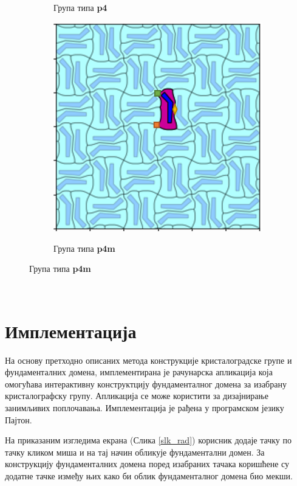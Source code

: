 \documentclass[12pt]{article}
\begin{document}
\begin{samepage}
\begin{figure}[H]
\begin{subfigure}[b]{0.32\textwidth}
    \label{fig:f21}
    \caption{Група типа \textbf{p4}}
  \end{subfigure}
  \begin{subfigure}[b]{0.32\textwidth}
    \includegraphics[width=.95\textwidth]{gotovo_cmm.png}
    \label{fig:f21}
    \caption{Група типа \textbf{p4m}}
  \end{subfigure}
\end{figure}
\end{samepage}

\quad \\ \qquad

\newpage
    \section{Имплементација}\label{implementacija}

На основу претходно описаних метода конструкције кристалоградске групе и фундаменталних домена, имплементирана је рачунарска апликација која омогућава интерактивну конструктцију фундаменталног домена за изабрану кристалографску групу.
Апликација се може користити за дизајнирање занимљивих поплочавања.
Имплементација је рађена у програмском језику Пајтон.

На приказаним изгледима екрана (Слика \ref{slk_rad}) корисник додаје тачку по тачку кликом миша и на тај начин обликује фундаментални домен. За конструкцију фундаменталних домена поред изабраних тачака коришћене су додатне тачке између њих како би облик фундаменталног домена био мекши. 
\end{document}
